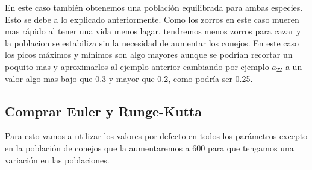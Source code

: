 \documentclass[]{article}
\begin{document}
\begin{figure}[H]
	\centering
	
\end{figure}

En este caso también obtenemos una población equilibrada para ambas especies. Esto se debe a lo explicado anteriormente. Como los zorros en este caso mueren mas rápido al tener una vida menos lagar, tendremos menos zorros para cazar y la poblacion se estabiliza sin la necesidad de aumentar los conejos. En este caso los picos máximos y mínimos son algo mayores aunque se podrían recortar un poquito mas y aproximarlos al ejemplo anterior cambiando por ejemplo $a_{22}$ a un valor algo mas bajo que 0.3 y mayor que 0.2, como podría ser 0.25.

\subsection{Comprar Euler y Runge-Kutta}
Para esto vamos a utilizar los valores por defecto en todos los parámetros excepto en la población de conejos que la aumentaremos a 600 para que tengamos una variación en las poblaciones.
\end{document}
